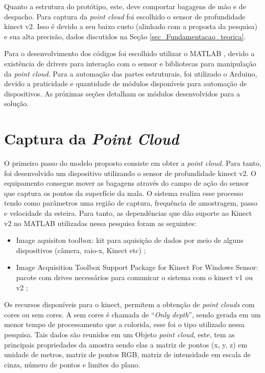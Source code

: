     Quanto a estrutura do protótipo, este, deve comportar bagagens de mão e de despacho. Para captura da \textit{point cloud} foi escolhido o sensor de profundidade kinect v2. Isso é devido a seu baixo custo (alinhado com a proposta da pesquisa) e sua alta precisão, dados discutidos na Seção \ref{sec_Fundamentacao_teorica}.
    
    Para o desenvolvimento dos códigos foi escolhido utilizar o MATLAB \cite{mathworks_2019_matlab}, devido a existência de drivers para interação com o sensor e bibliotecas para manipulação da \textit{point cloud}. Para a automação das partes estruturais, foi utilizado o Arduino, devido a praticidade e quantidade de módulos disponíveis para automação de dispositivos. As próximas seções detalham os módulos desenvolvidos para a solução.



\section{Captura da \textit{Point Cloud}}
\label{subsec_Captura da Point Cloud}


    O primeiro passo do modelo proposto consiste em obter a \textit{point cloud}. Para tanto, foi desenvolvido um dispositivo utilizando o sensor de profundidade kinect v2. O equipamento consegue mover as bagagens através do campo de ação do sensor que captura os pontos da superfície da mala. O sistema realiza esse processo tendo como parâmetros uma região de captura, frequência de amostragem, passo e velocidade da esteira. Para tanto, as dependências que dão suporte ao Kinect v2 no MATLAB utilizadas nessa pesquisa foram as seguintes: 

    \begin{itemize}
        \item Image aquisiton toolbox: kit para aquisição de dados por meio de alguns dispositivos (câmera, raio-x, Kinect etc) \cite{mathworks_2022_image};
        \item Image Acquisition Toolbox Support Package for Kinect For Windows Sensor: pacote com drives necessários para comunicar o sistema com o kinect v1 ou v2 \cite{mathwork_2022_image};
    \end{itemize}
    
    Os recursos disponíveis para o kinect, permitem a obtenção de \textit{point clouds} com cores ou sem cores. A sem cores é chamada de “\textit{Only depth}”, sendo gerada em um menor tempo de processamento que a colorida, esse foi o tipo utilizado nessa pesquisa. Tais dados são reunidos em um Objeto \textit{point cloud}, este, tem as principais propriedades da amostra sendo elas a matriz de pontos (x, y, z) em unidade de metros, matriz de pontos RGB, matriz de intensidade em escala de cinza, número de pontos e limites do plano. 
    
